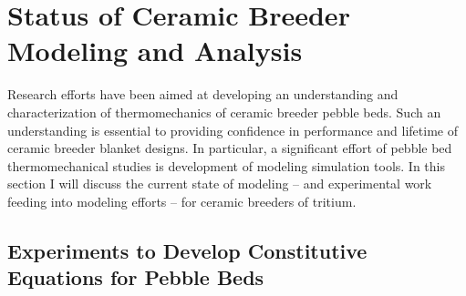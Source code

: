 \FloatBarrier




















%
%
\section{Status of Ceramic Breeder Modeling and Analysis}\label{sec:modeling-state}

Research efforts have been aimed at developing an understanding and characterization of thermomechanics of ceramic breeder pebble beds. Such an understanding is essential to providing confidence in performance and lifetime of ceramic breeder blanket designs. In particular, a significant effort of pebble bed thermomechanical studies is development of modeling simulation tools. In this section I will discuss the current state of modeling -- and experimental work feeding into modeling efforts -- for ceramic breeders of tritium.


\subsection{Experiments to Develop Constitutive Equations for Pebble Beds}


